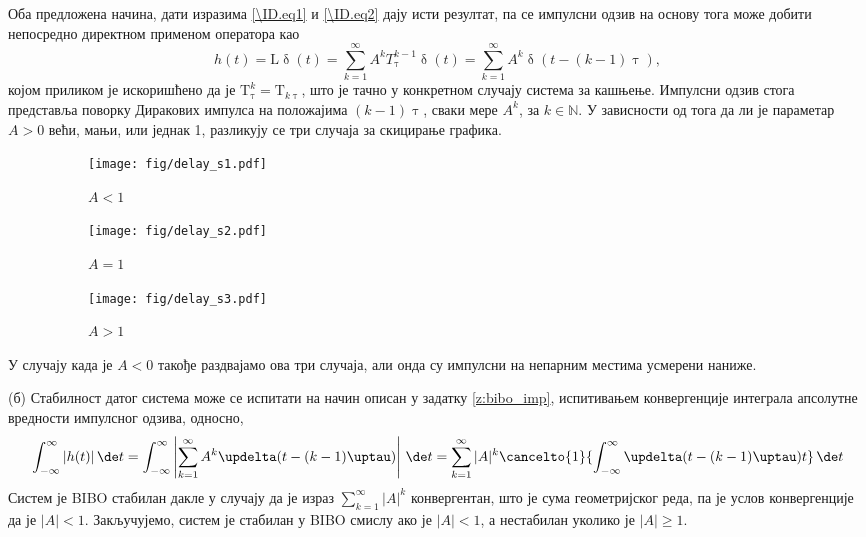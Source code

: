 Оба предложена начина, дати изразима \eqref{\ID.eq1} и \eqref{\ID.eq2} дају исти резултат, па се импулсни одзив на основу тога може добити непосредно директном 
применом оператора као 
\begin{equation}
    h(t) = \mathrm L \updelta(t) = \sum_{k = 1}^{\infty} A^{k} T_{\uptau}^{k-1} \updelta(t) = 
    \sum_{k = 1}^{\infty} A^{k} \updelta(t - (k-1)\uptau),
\end{equation}
којом приликом је искоришћено да је $\mathrm T^k_{\uptau} = \mathrm T_{k\uptau}$, што је тачно у конкретном случају система за кашњење.
Импулсни одзив стога представља поворку Диракових импулса на положајима $(k-1)\uptau$, сваки мере $A^k$, за $k \in \mathbb N$. 
У зависности од тога да ли је параметар $A > 0$ 
већи, мањи, или једнак 1, разликују се три случаја за скицирање графика. 

\begin{figure}[ht!]
    \hspace*{0pt}\hfill
    \begin{subfigure}[c]{0.33\textwidth}
        \centering
        \texttt{[image: fig/delay\_s1.pdf]}
        \caption{$A < 1$}
    \end{subfigure}
    \hspace*{0pt}\hfill
    \begin{subfigure}[c]{0.3\textwidth}
        \centering
        \texttt{[image: fig/delay\_s2.pdf]}
        \caption{$A = 1$}
    \end{subfigure}
    \hfill
    \hspace*{0pt}
    \hspace*{0pt}\hfill
    \begin{subfigure}[c]{0.3\textwidth}
        \centering
        \texttt{[image: fig/delay\_s3.pdf]}
        \caption{$A > 1$}
    \end{subfigure}
    \caption{}
\end{figure}
У случају када је $A < 0$ такође раздвајамо ова три случаја, али онда су импулсни на непарним местима усмерени наниже.

(б) Стабилност датог система може се испитати на начин описан у задатку \ref{z:bibo_imp}, испитивањем конвергенције  
интеграла апсолутне вредности импулсног одзива, односно,
\begin{equation}
    \int_{-\infty}^{\infty} |h(t)| \, \de t
    = 
    \int_{-\infty}^{\infty} \left\lvert 
    \sum_{k = 1}^{\infty} A^{k} \updelta(t - (k-1)\uptau)
    \right\rvert \, \de t 
    = 
     \sum_{k = 1}^{\infty} |A|^{k} \cancelto{1}{\int_{-\infty}^{\infty} \updelta(t - (k-1)\uptau) t} \, \de t
\end{equation}
Систем је BIBO стабилан дакле у случају да је израз $\sum_{k = 1}^{\infty} |A|^{k}$ конвергентан, што је 
сума геометријског реда, па је услов конвергенције да је $|A| < 1$. Закључујемо, систем је стабилан у BIBO смислу ако је $|A| < 1$,
а нестабилан уколико је $|A| \geq 1$.   

